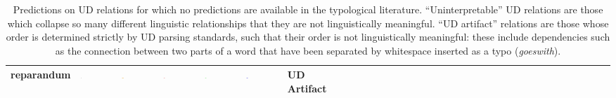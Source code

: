 \documentclass[10pt,twoside,lineno]{article}
\begin{document}
\begin{table}
\begin{center}
{\begin{tabular}{|l|l|l|ll|l|l|llllllllllllllllllllllllllll}
reparandum  &  \includegraphics[width=0.06\textwidth]{../results/correlations/figures/posteriors/posterior_perRelation_Real_reparandum.pdf}   &   \includegraphics[width=0.06\textwidth]{../results/correlations/figures/posteriors/posterior_perRelation_DependencyLength_reparandum.pdf}   &   \includegraphics[width=0.06\textwidth]{../results/correlations/figures/posteriors/posterior_perRelation_Predictability_reparandum.pdf}  &   \includegraphics[width=0.06\textwidth]{../results/correlations/figures/posteriors/posterior_perRelation_Parseability_reparandum.pdf}  &  \includegraphics[width=0.06\textwidth]{../results/correlations/figures/posteriors/posterior_perRelation_Efficiency_reparandum.pdf}   &                UD Artifact \\          

 \hline
\end{tabular}
}

\end{center}
\caption{Predictions on UD relations for which no predictions are available in the typological literature.  ``Uninterpretable'' UD relations are those which collapse so many different linguistic relationships that they are not linguistically meaningful. ``UD artifact'' relations are those whose order is determined strictly by UD parsing standards, such that their order is not linguistically meaningful: these include dependencies such as the connection between two parts of a word that have been separated by whitespace inserted as a typo (\emph{goeswith}).}
\label{tab:all-predictions-2}
\end{table}
\end{document}
